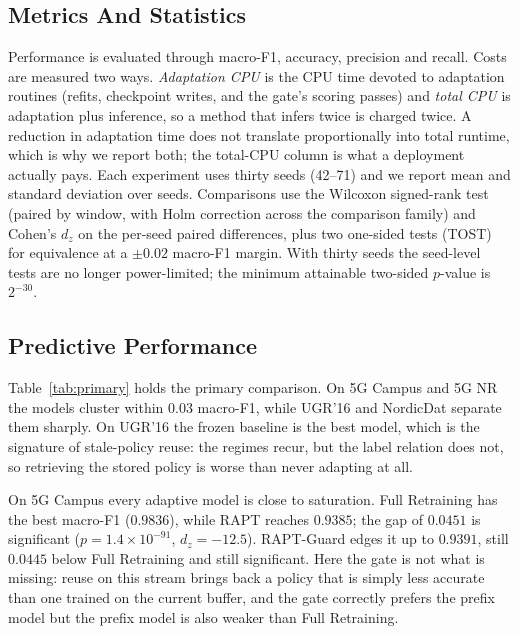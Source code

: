 \subsection{Metrics And Statistics}
Performance is evaluated through macro-F1, accuracy, precision and recall. Costs are measured two ways. \emph{Adaptation CPU} is the CPU time devoted to adaptation routines (refits, checkpoint writes, and the gate's scoring passes) and \emph{total CPU} is adaptation plus inference, so a method that infers twice is charged twice. A reduction in adaptation time does not translate proportionally into total runtime, which is why we report both; the total-CPU column is what a deployment actually pays. Each experiment uses thirty seeds (42--71) and we report mean and standard deviation over seeds. Comparisons use the Wilcoxon signed-rank test (paired by window, with Holm correction across the comparison family) and Cohen's $d_z$ on the per-seed paired differences, plus two one-sided tests (TOST) for equivalence at a $\pm0.02$ macro-F1 margin. With thirty seeds the seed-level tests are no longer power-limited; the minimum attainable two-sided $p$-value is $2^{-30}$.


\subsection{Predictive Performance}
Table~\ref{tab:primary} holds the primary comparison. On 5G Campus and 5G NR the models cluster within $0.03$ macro-F1, while UGR'16 and NordicDat separate them sharply. On UGR'16 the frozen baseline is the best model, which is the signature of stale-policy reuse: the regimes recur, but the label relation does not, so retrieving the stored policy is worse than never adapting at all.



On 5G Campus every adaptive model is close to saturation. Full Retraining has the best
macro-F1 ($0.9836$), while RAPT reaches $0.9385$; the gap of $0.0451$ is significant
($p = 1.4 \times 10^{-91}$, $d_z = -12.5$). RAPT-Guard edges it up to $0.9391$, still
$0.0445$ below Full Retraining and still significant. Here the gate is not what is
missing: reuse on this stream brings back a policy that is simply less accurate than one
trained on the current buffer, and the gate correctly prefers the prefix model but the
prefix model is also weaker than Full Retraining.

